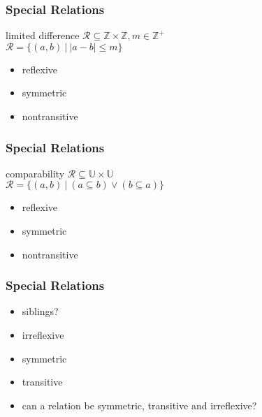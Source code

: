 \documentclass[dvipsnames]{beamer}
\begin{document}
\begin{frame}
  \frametitle{Special Relations}

  \begin{block}{limited difference}
    $\mathcal{R} \subseteq \mathbb{Z} \times \mathbb{Z}, m \in \mathbb{Z}^+$\\
    $\mathcal{R} = \{(a,b)~|~|a-b| \leq m\}$
  \end{block}

  \medskip
  \begin{itemize}
    \item reflexive
    \item symmetric
    \item nontransitive
  \end{itemize}
\end{frame}

\begin{frame}
  \frametitle{Special Relations}

  \begin{block}{comparability}
    $\mathcal{R} \subseteq \mathbb{U} \times \mathbb{U}$\\
    $\mathcal{R} = \{(a,b)~|~(a \subseteq b) \vee (b \subseteq a)\}$
  \end{block}

  \medskip
  \begin{itemize}
    \item reflexive
    \item symmetric
    \item nontransitive
  \end{itemize}
\end{frame}

\begin{frame}
  \frametitle{Special Relations}

  \begin{itemize}
    \item siblings?

    \medskip
    \item irreflexive
    \item symmetric
    \item transitive
  \end{itemize}

  \pause
  \medskip
  \begin{itemize}
    \item can a relation be symmetric, transitive and irreflexive?
  \end{itemize}
\end{frame}
\end{document}
